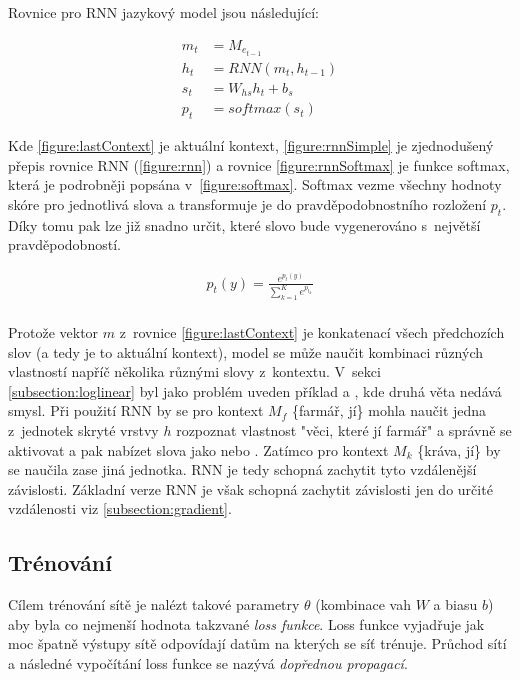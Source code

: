 Rovnice pro RNN jazykový model jsou následující:

\begin{align}
  m_{t}&=M_{e_{t-1}}\label{figure:lastContext} \\
  h_{t}&=RNN(m_t, h_{t-1}) \label{figure:rnnSimple} \\
  s_{t}&=W_{hs}h_t + b_s \label{figure:rnnSt} \\
  p_{t}&=softmax(s_t) \label{figure:rnnSoftmax}
\end{align}


Kde \ref{figure:lastContext} je aktuální kontext, \ref{figure:rnnSimple} je zjednodušený přepis rovnice RNN (\ref{figure:rnn}) a rovnice \ref{figure:rnnSoftmax} je funkce softmax, která je podrobněji popsána v~\ref{figure:softmax}. Softmax vezme všechny hodnoty skóre pro jednotlivá slova a transformuje je do pravděpodobnostního rozložení $p_t$. Díky tomu pak lze již snadno určit, které slovo bude vygenerováno s~největší pravděpodobností.


\begin{align}\label{figure:softmax}
  p_t(y)={\frac {e^{p_{t}(y)}}{\sum _{k=1}^{K}e^{p_{t_{k}}}}}
\end{align}
\\


Protože vektor $m$ z~rovnice \ref{figure:lastContext} je konkatenací všech předchozích slov (a tedy je to aktuální kontext), model se může naučit kombinaci různých vlastností napříč několika různými slovy z~kontextu. V~sekci \ref{subsection:loglinear} byl jako problém uveden příklad  a , kde druhá věta nedává smysl. Při použití RNN by se pro kontext $M_f$  \{farmář, jí\} mohla naučit jedna z~jednotek skryté vrstvy $h$ rozpoznat vlastnost "věci, které jí farmář" a správně se aktivovat a pak nabízet slova jako  nebo . Zatímco pro kontext $M_k$ \{kráva, jí\} by se naučila zase jiná jednotka. RNN je tedy schopná zachytit tyto vzdálenější závislosti. Základní verze RNN je však schopná zachytit závislosti jen do určité vzdálenosti viz \ref{subsection:gradient}.


\subsection{Trénování} \label{subsection:training}
Cílem trénování sítě je nalézt takové parametry $\theta$ (kombinace vah $W$ a biasu $b$) aby byla co nejmenší hodnota takzvané \emph{loss funkce}. Loss funkce vyjadřuje jak moc špatně výstupy sítě odpovídají datům na kterých se síť trénuje. Průchod sítí a následné vypočítání loss funkce se nazývá \emph{dopřednou propagací}.


